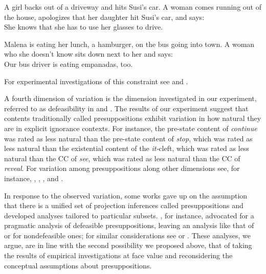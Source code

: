 \documentclass[11pt,fleqn]{article}
\def\infelic{{\leavevmode\llap{\#}}}
\newcommand{\6}{\mbox{$[\hspace*{-.6mm}[$}}
\newcommand{\9}{\mbox{$]\hspace*{-.6mm}]$}}
\begin{document}
\begin{exe}
\ex\label{scf} \citealt[78, 80]{brst-lang11}
\begin{xlist}
\ex A girl backs out of a driveway and hits Susi's car. A woman comes running out of the house, apologizes that her daughter hit Susi's car, and says: \\ She knows that she has to use her glasses to drive.

\ex Malena is eating her lunch, a hamburger, on the bus going into town. A woman who she doesn't know sits down next to her and says:
\\ \infelic Our bus driver is eating empanadas, too.

\end{xlist}
\end{exe}
For experimental investigations of this constraint see \citealt{wilcox-etal2021} and \citealt{solstad-bott2024}.

A fourth dimension of variation is the dimension investigated in our experiment, referred to as defeasibility in \citealt{simons01} and \citealt{abusch10}. The results of our experiment suggest that contents traditionally called presuppositions exhibit variation in how natural they are in explicit ignorance contexts. For instance,  the pre-state content of {\em continue} was rated as less natural than the pre-state content of {\em stop}, which was rated as less natural than the existential content of the {\em it-}cleft, which was rated as less natural than the CC of {\em see}, which was rated as less natural than the CC of {\em reveal}. For variation among presuppositions along other dimensions see, for instance, \citealt{sudo-thesis}, \citealt{bade2016-thesis}, \citealt{djaerv2019-thesis}, and \citealt{goebel2020-thesis}.

In response to the observed variation, some works gave up on the assumption that there is a unified set of projection inferences called presuppositions and developed analyses tailored to particular subsets. \citealt{abusch10}, for instance, advocated for a pragmatic analysis of defeasible presuppositions, leaving an analysis like that of \citealt{heim83} or \citealt{vds92} for nondefeasible ones; for similar considerations see \citealt{abrusan2011,romoli2015} or \citealt{roberts-simons2024}. These analyses, we argue, are in line with the second possibility we proposed above, that of taking the results of empirical investigations at face value and reconsidering the conceptual assumptions about presuppositions. 
\end{document}
